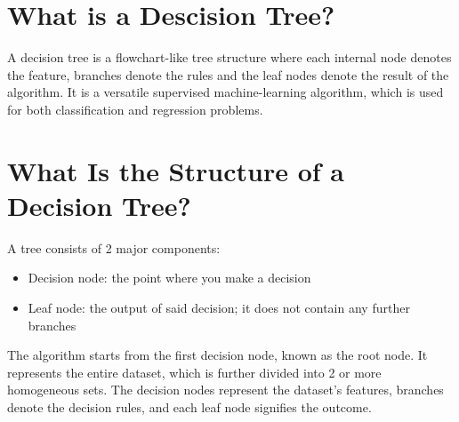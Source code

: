 \section{What is a Descision Tree?}
    A decision tree is a flowchart-like tree structure where each internal node denotes the feature, branches denote the rules and the leaf nodes denote the result of the algorithm. 
    It is a versatile supervised machine-learning algorithm, which is used for both classification and regression problems. 

\section{What Is the Structure of a Decision Tree?}
    A tree consists of 2 major components:
    \begin{itemize}
        \item Decision node: the point where you make a decision
        \item Leaf node: the output of said decision; it does not contain any further branches
    \end{itemize}
    The algorithm starts from the first decision node, known as the root node. It represents the entire dataset, which is further divided into 2 or more homogeneous sets. The decision nodes represent the dataset's features, branches denote the decision rules, and each leaf node signifies the outcome.    


